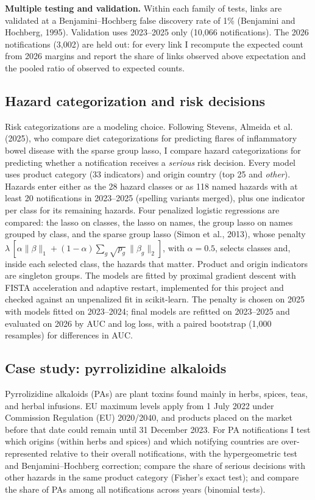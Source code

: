 \documentclass[11pt]{article}
\begin{document}
\textbf{Multiple testing and validation.} Within each family of tests, links are validated at a Benjamini–Hochberg false discovery rate of 1\% (Benjamini and Hochberg, 1995). Validation uses 2023–2025 only (10,066 notifications). The 2026 notifications (3,002) are held out: for every link I recompute the expected count from 2026 margins and report the share of links observed above expectation and the pooled ratio of observed to expected counts.

\subsection{Hazard categorization and risk decisions}

Risk categorizations are a modeling choice. Following Stevens, Almeida et al. (2025), who compare diet categorizations for predicting flares of inflammatory bowel disease with the sparse group lasso, I compare hazard categorizations for predicting whether a notification receives a \emph{serious} risk decision. Every model uses product category (33 indicators) and origin country (top 25 and \emph{other}). Hazards enter either as the 28 hazard classes or as 118 named hazards with at least 20 notifications in 2023–2025 (spelling variants merged), plus one indicator per class for its remaining hazards. Four penalized logistic regressions are compared: the lasso on classes, the lasso on names, the group lasso on names grouped by class, and the sparse group lasso (Simon et al., 2013), whose penalty $\lambda\,[\alpha\lVert\beta\rVert_1+(1-\alpha)\sum_g\sqrt{p_g}\,\lVert\beta_g\rVert_2]$, with $\alpha=0.5$, selects classes and, inside each selected class, the hazards that matter. Product and origin indicators are singleton groups. The models are fitted by proximal gradient descent with FISTA acceleration and adaptive restart, implemented for this project and checked against an unpenalized fit in scikit-learn. The penalty is chosen on 2025 with models fitted on 2023–2024; final models are refitted on 2023–2025 and evaluated on 2026 by AUC and log loss, with a paired bootstrap (1,000 resamples) for differences in AUC.

\subsection{Case study: pyrrolizidine alkaloids}

Pyrrolizidine alkaloids (PAs) are plant toxins found mainly in herbs, spices, teas, and herbal infusions. EU maximum levels apply from 1 July 2022 under Commission Regulation (EU) 2020/2040, and products placed on the market before that date could remain until 31 December 2023. For PA notifications I test which origins (within herbs and spices) and which notifying countries are over-represented relative to their overall notifications, with the hypergeometric test and Benjamini–Hochberg correction; compare the share of serious decisions with other hazards in the same product category (Fisher's exact test); and compare the share of PAs among all notifications across years (binomial tests).
\end{document}
